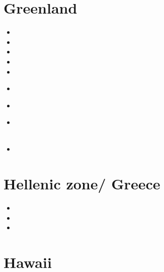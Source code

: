 \section{Greenland}

\begin{small}
\begin{itemize}
\item[\nineteenninetyseven]
\item[\twothousandeleven]
\item[\twothousandtwelve]
\item[\twothousandthirteen]
\item[\twothousandfourteen]
\item[\twothousandfifteen]
 \\
\item[\twothousandseventeen]
\item[\twothousandnineteen]
 \\
 \\
\item[\twothousandtwentyfour] 
\end{itemize}
\end{small}


\section{Hellenic zone/ Greece}

\begin{small}
\begin{itemize}
\item[\nineteeneightyeight] 
\item[\twothousandthirteen]
\item[\twothousandfourteen]
\end{itemize}
\end{small}

\section{Hawaii}

